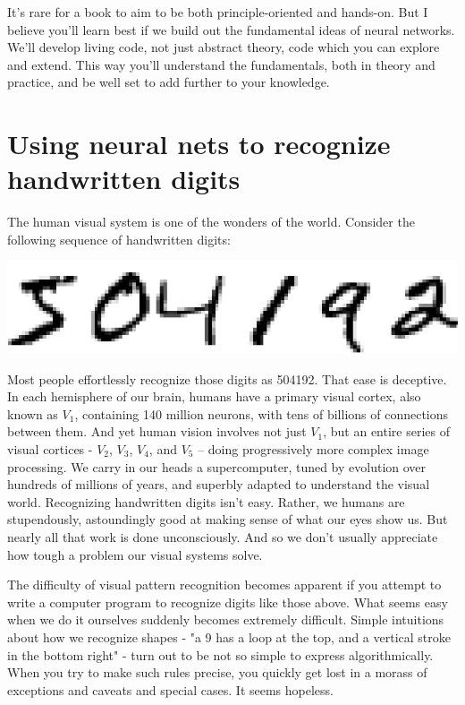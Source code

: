 \documentclass[a4paper,12pt]{report}%
\begin{document}
It's rare for a book to aim to be both principle-oriented and hands-on. But I believe you'll learn best if we build out the fundamental ideas of neural networks. We'll develop living code, not just abstract theory, code which you can explore and extend. This way you'll understand the fundamentals, both in theory and practice, and be well set to add further to your knowledge.




\chapter{\color{IAF} \bf Using neural nets to recognize handwritten digits}
The human visual system is one of the wonders of the world. Consider the following sequence of handwritten digits:

\begin{center}
 \includegraphics[width=0.7\linewidth]{images/digits.png}
\end{center}

Most people effortlessly recognize those digits as 504192. That ease is deceptive. In each hemisphere of our brain, humans have a primary visual cortex, also known as $V_{1}$, containing 140 million neurons, with tens of billions of connections between them. And yet human vision involves not just $V_{1}$, but an entire series of visual cortices - $V_{2}$, $V_{3}$, $V_{4}$, and $V_{5}$ -- doing progressively more complex image processing. We carry in our heads a supercomputer, tuned by evolution over hundreds of millions of years, and superbly adapted to understand the visual world. Recognizing handwritten digits isn't easy. Rather, we humans are stupendously, astoundingly good at making sense of what our eyes show us. But nearly all that work is done unconsciously. And so we don't usually appreciate how tough a problem our visual systems solve.

The difficulty of visual pattern recognition becomes apparent if you attempt to write a computer program to recognize digits like those above. What seems easy when we do it ourselves suddenly becomes extremely difficult. Simple intuitions about how we recognize shapes - "a 9 has a loop at the top, and a vertical stroke in the bottom right" - turn out to be not so simple to express algorithmically. When you try to make such rules precise, you quickly get lost in a morass of exceptions and caveats and special cases. It seems hopeless.
\end{document}
